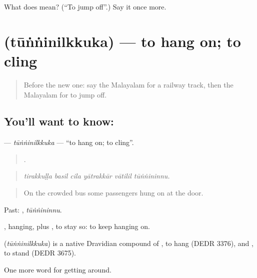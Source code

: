 \begin{tcolorbox}[breakable,colback=teal!4,colframe=teal!35!black,title={Before you move on}]
What does  mean? (\textquotedblleft{}To jump off\textquotedblright{}.) Say it once more.
\end{tcolorbox}
\section[\texorpdfstring{\ml{തൂങ്ങിനിൽക്കുക} (tūṅṅinilkkuka)}{തൂങ്ങിനിൽക്കുക (tūṅṅinilkkuka)}]{ (tūṅṅinilkkuka) — to hang on; to cling}

\label{lesson:ML-C474-tunninilkkuka}



\begin{quote}
Before the new one: say the Malayalam for a railway track, then the Malayalam for to jump off.
\end{quote}

\subsection*{You'll want to know: }
\textbf{} — \emph{tūṅṅinilkkuka} — \textquotedblleft{}to hang on; to cling\textquotedblright{}.

\begin{quote}
     .
\end{quote}

\begin{quote}
\emph{tirakkuḷḷa basil cila yātrakkār vātilil tūṅṅininnu.}
\end{quote}

\begin{quote}
On the crowded bus some passengers hung on at the door.
\end{quote}

Past: , \emph{tūṅṅininnu}.

, hanging, plus , to stay so: to keep hanging on.

\begin{cousinweb}
\textbf{} (\emph{tūṅṅinilkkuka}) is a native Dravidian compound of , to hang (DEDR 3376), and , to stand (DEDR 3675).
\end{cousinweb}

\begin{grammarlens}[title={What you've built}]
One more word for getting around.
\end{grammarlens}

